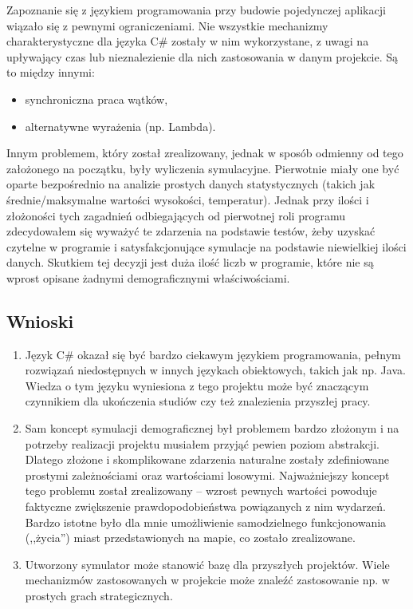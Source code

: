 \documentclass[a4paper,12pt]{article}
\newcommand\tab[1][0.6cm]{\hspace*{#1} }
\begin{document}
\tab Zapoznanie się z językiem programowania przy budowie pojedynczej aplikacji wiązało się z pewnymi ograniczeniami. Nie wszystkie mechanizmy charakterystyczne dla języka C\# zostały w nim wykorzystane, z uwagi na upływający czas lub nieznalezienie dla nich zastosowania w danym projekcie. Są to między innymi:

\begin{itemize}
\item synchroniczna praca wątków,
\item alternatywne wyrażenia (np. Lambda).
\end{itemize}

\tab Innym problemem, który został zrealizowany, jednak w sposób odmienny od tego założonego na początku, były wyliczenia symulacyjne. Pierwotnie miały one być oparte bezpośrednio na analizie prostych danych statystycznych (takich jak średnie/maksymalne wartości wysokości, temperatur). Jednak przy ilości i złożoności tych zagadnień odbiegających od pierwotnej roli programu zdecydowałem się wyważyć te zdarzenia na podstawie testów, żeby uzyskać czytelne w programie i satysfakcjonujące symulacje na podstawie niewielkiej ilości danych. Skutkiem tej decyzji jest duża ilość liczb w programie, które nie są wprost opisane żadnymi demograficznymi właściwościami.

\subsection{Wnioski}

\begin{enumerate}
\item Język C\# okazał się być bardzo ciekawym językiem programowania, pełnym rozwiązań niedostępnych w innych językach obiektowych, takich jak np. Java. Wiedza o tym języku wyniesiona z tego projektu może być znaczącym czynnikiem dla ukończenia studiów czy też znalezienia przyszłej pracy.

\item Sam koncept symulacji demograficznej był problemem bardzo złożonym i na potrzeby realizacji projektu musiałem przyjąć pewien poziom abstrakcji. Dlatego złożone i skomplikowane zdarzenia naturalne zostały zdefiniowane prostymi zależnościami oraz wartościami losowymi. Najważniejszy koncept tego problemu został zrealizowany -- wzrost pewnych wartości powoduje faktyczne zwiększenie prawdopodobieństwa powiązanych z nim wydarzeń. Bardzo istotne było dla mnie umożliwienie samodzielnego funkcjonowania (,,życia'') miast przedstawionych na mapie, co zostało zrealizowane.

\item Utworzony symulator może stanowić bazę dla przyszłych projektów. Wiele mechanizmów zastosowanych w projekcie może znaleźć zastosowanie np. w prostych grach strategicznych.
\end{enumerate}
\end{document}
